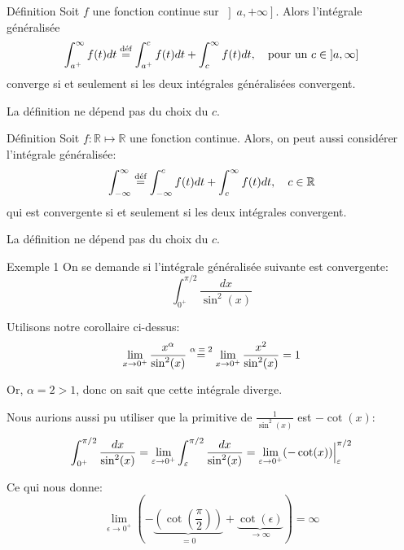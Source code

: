 \documentclass[a4paper]{article}
\begin{document}
\begin{parag}{Définition}
    Soit $f$ une fonction continue sur $\left]a, +\infty\right] $. Alors l'intégrale généralisée 
    \[\int_{a^+}^{\infty} f\left(t\right)dt \over{=}{déf} \int_{a^+}^{c} f\left(t\right)dt + \int_{c}^{\infty} f\left(t\right)dt, \mathspace \text{pour un } c \in \left]a, \infty\right] \]
    converge si et seulement si les deux intégrales généralisées convergent.

    La définition ne dépend pas du choix du $c$.
\end{parag}

\begin{parag}{Définition}
    Soit $f : \mathbb{R}\mapsto  \mathbb{R}$ une fonction continue. Alors, on peut aussi considérer l'intégrale généralisée:
    \[\int_{-\infty}^{\infty} \over{=}{déf} \int_{-\infty}^{c} f\left(t\right)dt + \int_{c}^{\infty} f\left(t\right)dt, \mathspace c \in \mathbb{R}\]
    qui est convergente si et seulement si les deux intégrales convergent.

    La définition ne dépend pas du choix du $c$.
\end{parag}

\begin{parag}{Exemple 1}
    On se demande si l'intégrale généralisée suivante est convergente: 
    \[\int_{0^+}^{\pi / 2} \frac{dx}{\sin^2\left(x\right)}\]
    
    Utilisons notre corollaire ci-dessus: 
    \[\lim_{x \to 0^+} \frac{x^{\alpha}}{\sin^2\left(x\right)} \over{=}{$\alpha = 2$} \lim_{x \to 0^+} \frac{x^2}{\sin^2\left(x\right)} = 1\]
    
    Or, $\alpha = 2 > 1$, donc on sait que cette intégrale diverge.

    Nous aurions aussi pu utiliser que la primitive de $\frac{1}{\sin^2\left(x\right)}$ est $-\cot\left(x\right)$: 
    \[\int_{0^+}^{\pi / 2} \frac{dx}{\sin^2\left(x\right)} = \lim_{\epsilon \to 0^+} \int_{\epsilon}^{\pi / 2} \frac{dx}{\sin^2\left(x\right)} = \lim_{\epsilon \to 0^+} \left(-\cot\left(x\right)\right) \eval_{\epsilon}^{\pi / 2}\]

    Ce qui nous donne:
    \[\lim_{\epsilon \to 0^+} \left(-\underbrace{\left(\cot\left(\frac{\pi}{2}\right)\right)}_{= 0} + \underbrace{\cot\left(\epsilon\right)}_{\to \infty}\right) = \infty\]
\end{parag}
\end{document}
